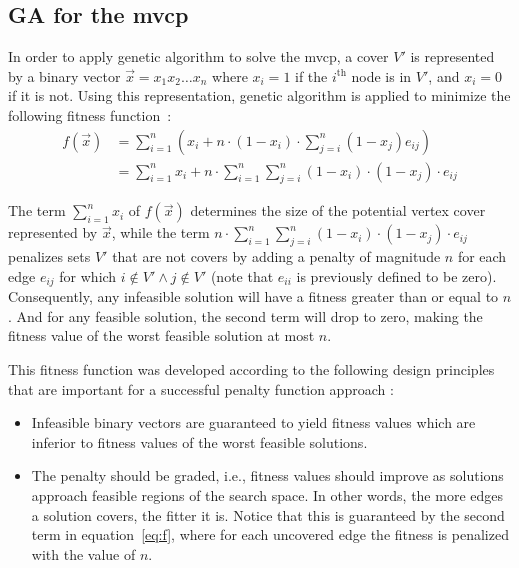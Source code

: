 \documentclass[12pt]{article}
\begin{document}
\subsection{GA for the mvcp}
\label{sec:GAmvcp}
In order to apply genetic algorithm to solve the mvcp, a cover $V'$ is represented
by a binary vector $\vec{x} = x_1x_2 \dots x_n$ where $x_i = 1$ if
the $i^{\text{th}}$ node is in $V'$, and $x_i = 0$ if it is not.
Using this representation, genetic algorithm is applied to minimize the following
fitness function~\cite{mvcp-back}:
\begin{equation}
\label{eq:f}
\begin{split}
f(\vec{x})	&= \sum_{i=1}^{n} \left( x_i+n \cdot (1-x_i) \cdot
			   \sum_{j=i}^{n} (1-x_j) e_{ij} \right) \\
 			&= \sum_{i=1}^{n} x_i + n \cdot \sum_{i=1}^{n}
			   \sum_{j=i}^{n} (1-x_i) \cdot (1-x_j) \cdot e_{ij}
\end{split}
\end{equation}

The term $ \sum_{i=1}^{n} x_i $ of $ f(\vec{x}) $ determines the size of the
potential vertex cover represented by $\vec{x}$, while the term
$ n \cdot \sum_{i=1}^{n} \sum_{j=i}^{n} (1-x_i) \cdot (1-x_j) \cdot e_{ij} $
penalizes sets $V'$ that
are not covers by adding a penalty of magnitude $n$ for
each edge $e_{ij}$ for which $i \notin V' \wedge j \notin V'$
(note that $e_{ii}$ is previously defined to be zero).
Consequently, any infeasible solution will have a fitness greater than
or equal to $n$. And for any feasible solution, the second term will
drop to zero, making the fitness value of the worst feasible solution at most $n$.

This fitness function was developed according to the
following design principles that are important for a
successful penalty function approach \cite{7:mvcp, 11:mvcp}:
\begin{itemize}
\vspace{-4mm}

\item Infeasible binary vectors are guaranteed to yield fitness
values which are inferior to fitness values of
the worst feasible solutions.

\item The penalty should be graded, i.e., fitness values
should improve as solutions approach feasible regions
of the search space. In other words, the more edges a solution
covers, the fitter it is. Notice that this is guaranteed by the
second term in equation~\ref{eq:f}, where for each uncovered edge
the fitness is penalized with the value of $n$.
\end{itemize}
\end{document}
